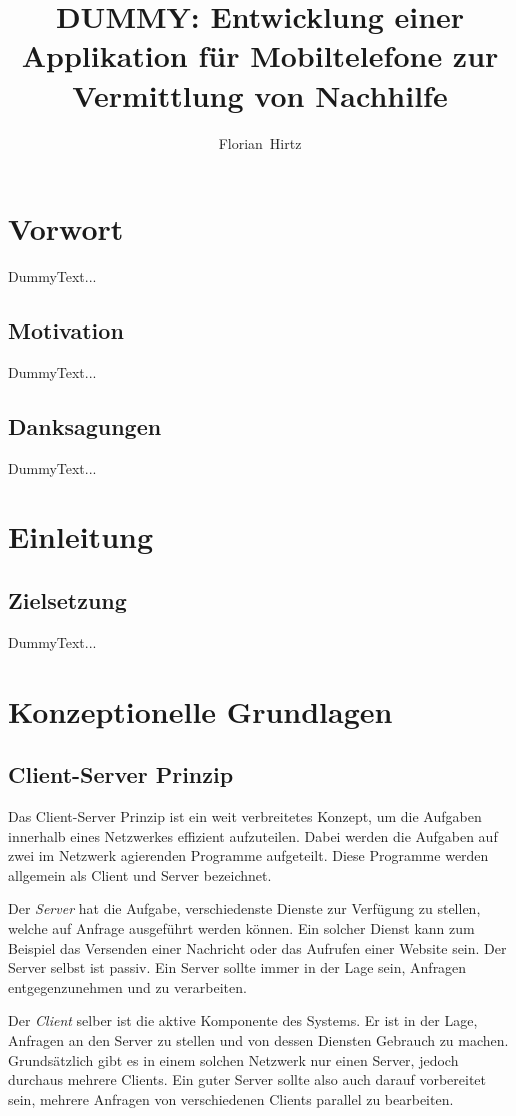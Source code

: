 \documentclass[a4paper,11pt]{report}
\author{Florian~Hirtz}
\title{DUMMY: Entwicklung einer Applikation für Mobiltelefone zur Vermittlung von Nachhilfe}
\begin{document}
	\maketitle
	\tableofcontents
	
	
	\chapter{Vorwort}
	DummyText...
		\section{Motivation}
		DummyText...
		\section{Danksagungen}
		DummyText...
	
	\chapter{Einleitung}
		\section{Zielsetzung}
		DummyText...
	
	\chapter{Konzeptionelle Grundlagen}
		\section{Client-Server Prinzip}
		Das Client-Server Prinzip ist ein weit verbreitetes Konzept, um die Aufgaben innerhalb eines Netzwerkes effizient aufzuteilen. Dabei werden die Aufgaben auf zwei im Netzwerk agierenden Programme aufgeteilt. Diese Programme werden allgemein als Client und Server bezeichnet.
	 
		Der \emph{Server} hat die Aufgabe, verschiedenste Dienste zur Verfügung zu stellen, welche auf Anfrage ausgeführt werden können. Ein solcher Dienst kann zum Beispiel das Versenden einer Nachricht oder das Aufrufen einer Website sein. Der Server selbst ist passiv. Ein Server sollte immer in der Lage sein, Anfragen entgegenzunehmen und zu verarbeiten.
	
		Der \emph{Client} selber ist die aktive Komponente des Systems. Er ist in der Lage, Anfragen an den Server zu stellen und von dessen Diensten Gebrauch zu machen.
		Grundsätzlich gibt es in einem solchen Netzwerk nur einen Server, jedoch durchaus mehrere Clients. Ein guter Server sollte also auch darauf vorbereitet sein, mehrere Anfragen von verschiedenen Clients parallel zu bearbeiten. \cite{fachadmin.de:ServerClient}
		
\end{document}
